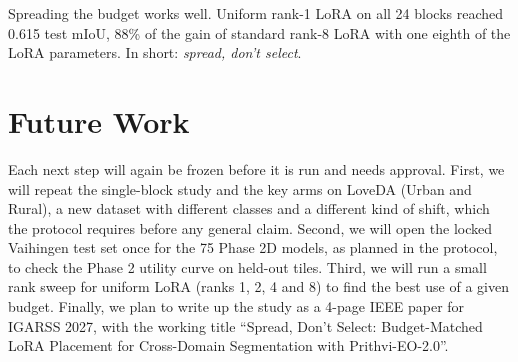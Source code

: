 \documentclass[11pt,a4paper]{report}
\begin{document}
Spreading the budget works well. Uniform rank-1 LoRA on all 24 blocks reached 0.615 test mIoU, 88\% of the gain of standard rank-8 LoRA with one eighth of the LoRA parameters. In short: \textit{spread, don't select}.

\section{Future Work}

Each next step will again be frozen before it is run and needs approval. First, we will repeat the single-block study and the key arms on LoveDA \cite{wang2021loveda} (Urban and Rural), a new dataset with different classes and a different kind of shift, which the protocol requires before any general claim. Second, we will open the locked Vaihingen test set once for the 75 Phase 2D models, as planned in the protocol, to check the Phase 2 utility curve on held-out tiles. Third, we will run a small rank sweep for uniform LoRA (ranks 1, 2, 4 and 8) to find the best use of a given budget. Finally, we plan to write up the study as a 4-page IEEE paper for IGARSS 2027, with the working title ``Spread, Don't Select: Budget-Matched LoRA Placement for Cross-Domain Segmentation with Prithvi-EO-2.0''.
\end{document}
